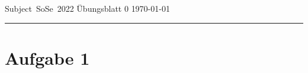 \documentclass[a4paper, 11pt]{article}
\begin{document}
Subject~SoSe~2022
\hfill
{\Large
    Übungsblatt 0 %
}
\hfill
\today



\hrule

\section*{Aufgabe 1}

\end{document}
